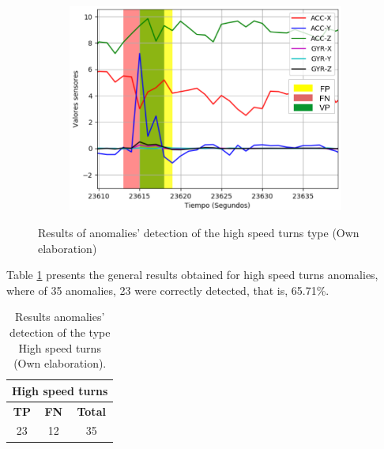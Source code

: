 \begin{figure}[H]
{\begin{varwidth}{\textwidth}
\begin{subfigure}[h]{0.45\textwidth}
            \includegraphics[width=\textwidth]{imagenes/Cap5/giro3}
        \end{subfigure} 
        \end{varwidth}}
        \caption{Results of anomalies' detection of the high speed turns type (Own elaboration)}
		\label{fig:resultados_giros}
    \end{figure}

Table \ref{table:giros_resultado} presents the general results obtained for high speed turns anomalies, where of 35 anomalies, 23 were correctly detected, that is, 65.71\%.

\begin{table}[H]
\centering
\begin{center}
\begin{tabular}{|c|c|c|}
\hline
\multicolumn{3}{|l|}{\textbf{High speed turns}} \\ \hline
\textbf{TP}   & \textbf{FN}   & \textbf{Total}  \\ \hline
\cellcolor[HTML]{AADD99}23  & \cellcolor[HTML]{DF9F9F}12  & 35             \\ \hline
\end{tabular}
\caption{Results anomalies' detection of the type High speed turns (Own elaboration).}
\label{table:giros_resultado}
\end{center}
\end{table}

